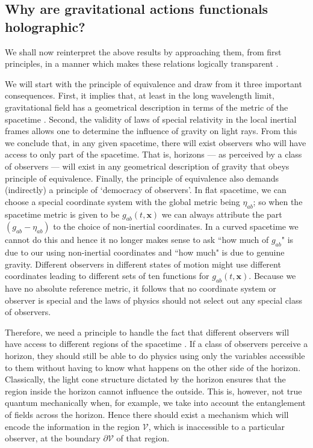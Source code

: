 \documentclass[12pt]{iopart}
\begin{document}
\subsection{Why are gravitational actions functionals holographic?}

We shall now reinterpret the above results by approaching them, from first principles, in  a manner which makes these  relations logically transparent \cite{TPhol002}.

We will start with the principle of equivalence and  draw from it three important consequences. First, it implies that, at least in the long wavelength limit, gravitational field has a geometrical description in terms of the metric of the spacetime \cite{mtw}. Second, the validity of laws of special relativity in the local inertial frames allows one to determine the influence of gravity on light rays. From this we conclude that, in any given spacetime, there will exist observers who will have 
access to only part of the spacetime. That is, horizons --- as perceived by a class of observers ---  will exist in any geometrical description of gravity that obeys principle of equivalence.
Finally, the principle of equivalence also demands (indirectly) a principle of `democracy of observers'. 
In flat spacetime, we can choose a special coordinate system with the global metric being $\eta_{ab}$; so  when the spacetime   metric is given to be $g_{ab}(t,\mathbf{x})$ 
we  can always attribute the part $(g_{ab}-\eta_{ab})$ to the choice of non-inertial coordinates. 
In a curved spacetime we cannot do this and hence it no longer makes sense to ask ``how much of $g_{ab}$" is due to our using non-inertial coordinates and ``how much" is due to genuine gravity.  
Different observers in different states of motion might use different coordinates leading to different sets of ten functions for $g_{ab}(t,\mathbf{x})$. Because we have no absolute reference metric, it follows that 
no coordinate system or  observer is special and the  
 laws of physics should not select out any special class of observers. 


Therefore,  we need a  principle
 to handle the fact that different observers will have access to different regions of   the spacetime \cite{tpapoorva}.
  If a class of observers perceive a horizon, they should still be able to do physics using only the variables accessible to them without having to know what happens on the other side of the horizon.
  Classically, the light cone structure dictated by the horizon ensures that 
  the region inside the horizon cannot influence the outside. This is, however, not true quantum mechanically when, for example, we take into
  account the entanglement of fields across the horizon.
   Hence there should exist a mechanism which will encode
  the information in the region $\mathcal{V}$, which is inaccessible to a particular observer, at the boundary $\partial \mathcal{V}$ of that region.
  
\end{document}
